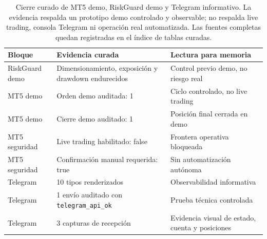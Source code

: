 \begin{table}[H]
\centering
\scriptsize
\setlength{\tabcolsep}{4pt}
\begin{tabular}{p{}p{}p{}}
\hline
Bloque & Evidencia curada & Lectura para memoria \\
\hline
RiskGuard demo & Dimensionamiento, exposici\'on y drawdown endurecidos & Control previo demo, no riesgo real \\
MT5 demo & Orden demo auditada: 1 & Ciclo controlado, no live trading \\
MT5 demo & Cierre demo auditado: 1 & Posici\'on final cerrada en demo \\
MT5 seguridad & Live trading habilitado: false & Frontera operativa bloqueada \\
MT5 seguridad & Confirmaci\'on manual requerida: true & Sin automatizaci\'on aut\'onoma \\
Telegram & 10 tipos renderizados & Observabilidad informativa \\
Telegram & 1 env\'io auditado con \texttt{telegram\_api\_ok} & Prueba t\'ecnica controlada \\
Telegram & 3 capturas de recepci\'on & Evidencia visual de estado, cuenta y posiciones \\
\hline
\end{tabular}
\caption{Cierre curado de MT5 demo, RiskGuard demo y Telegram informativo. La evidencia respalda un prototipo demo controlado y observable; no respalda live trading, consola Telegram ni operaci\'on real automatizada. Las fuentes completas quedan registradas en el \'indice de tablas curadas.}
\label{tab:mt5-riskguard-telegram-cierre}
\end{table}
